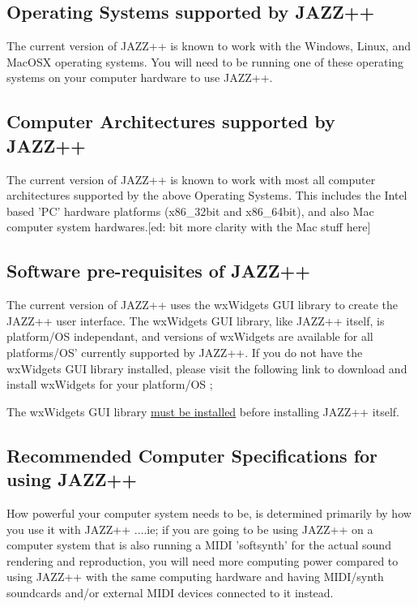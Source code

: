 \documentclass[letterpaper]{report}
\begin{document}
\subsection{Operating Systems supported by JAZZ++}

The current version of JAZZ++ is known to work with the Windows, Linux, and
MacOSX operating systems. You will need to be running one of these operating
systems on your computer hardware to use JAZZ++.

\subsection{Computer Architectures supported by JAZZ++}

The current version of JAZZ++ is known to work with most all computer
architectures supported by the above Operating Systems. This includes the
Intel based 'PC' hardware platforms (x86\_32bit and x86\_64bit), and also Mac
computer system hardwares.[ed: bit more clarity with the Mac stuff here]

\subsection{Software pre-requisites of JAZZ++}

The current version of JAZZ++ uses the wxWidgets GUI library to create
the JAZZ++ user interface. The wxWidgets GUI library, like JAZZ++ itself,
is platform/OS independant, and versions of wxWidgets are available for
all platforms/OS' currently supported by JAZZ++. If you do not have the
wxWidgets GUI library installed, please visit the following link to download
and install wxWidgets for your platform/OS ;

\begin{indented}{2cm}
\end{indented}

The wxWidgets GUI library \underline{must be installed} before installing
JAZZ++ itself.


\subsection{Recommended Computer Specifications for using JAZZ++}

How powerful your computer system needs to be, is determined primarily by
how you use it with JAZZ++ ....ie; if you are going to be using JAZZ++ on
a computer system that is also running a MIDI 'softsynth' for the actual sound 
rendering and reproduction, you will need more computing power compared to 
using JAZZ++ with the same computing hardware and having MIDI/synth soundcards
and/or external MIDI devices connected to it instead.
\end{document}
